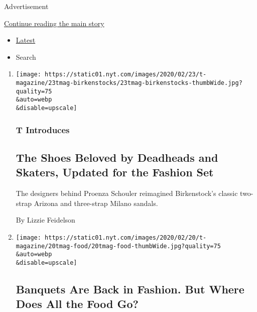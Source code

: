 Advertisement

\protect\hyperlink{after-mid1}{Continue reading the main story}

\begin{itemize}
\tightlist
\item
  \protect\hyperlink{stream-panel}{Latest}
\item
  Search
\end{itemize}

\begin{enumerate}
\def\labelenumi{\arabic{enumi}.}
\item
  \href{/2020/02/23/t-magazine/proenza-schouler-birkenstock.html}{}

  \texttt{[image: https://static01.nyt.com/images/2020/02/23/t-magazine/23tmag-birkenstocks/23tmag-birkenstocks-thumbWide.jpg?quality=75\\\&auto=webp\\\&disable=upscale]}

  \hypertarget{t-introduces}{%
  \subsubsection{T Introduces}\label{t-introduces}}

  \hypertarget{the-shoes-beloved-by-deadheads-and-skaters-updated-for-the-fashion-set}{%
  \subsection{The Shoes Beloved by Deadheads and Skaters, Updated for
  the Fashion
  Set}\label{the-shoes-beloved-by-deadheads-and-skaters-updated-for-the-fashion-set}}

  The designers behind Proenza Schouler reimagined Birkenstock's classic
  two-strap Arizona and three-strap Milano sandals.

  By Lizzie Feidelson
\item
  \href{/2020/02/21/t-magazine/fashion-banquet-food-waste.html}{}

  \texttt{[image: https://static01.nyt.com/images/2020/02/20/t-magazine/20tmag-food/20tmag-food-thumbWide.jpg?quality=75\\\&auto=webp\\\&disable=upscale]}

  \hypertarget{banquets-are-back-in-fashion-but-where-does-all-the-food-go}{%
  \subsection{Banquets Are Back in Fashion. But Where Does All the Food
  Go?}\label{banquets-are-back-in-fashion-but-where-does-all-the-food-go}}


\end{enumerate}
